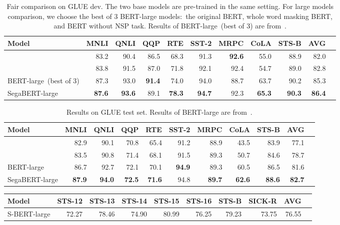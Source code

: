 \documentclass[letterpaper]{article}
\begin{document}
\begin{table*}[!htp]\centering
  \small
  \begin{tabular}{lrrrrrrrrrr}\toprule
    Model &MNLI &QNLI &QQP &RTE &SST-2 &MRPC &CoLA &STS-B &AVG \\\midrule
     &83.2 &90.4 &86.5 &68.3 &91.3 &\textbf{92.6} &55.0 &88.9 &82.0 \\
     &83.8 &91.5 &87.0 &71.8 &92.1 &92.4 &54.7 &89.0 &82.8 \\
    BERT-large~(best of 3) &87.3 &93.0 &\textbf{91.4} &74.0 &94.0 &88.7 &63.7 &90.2 &85.3 \\
    SegaBERT-large &\textbf{87.6} &\textbf{93.6} &89.1 &\textbf{78.3} &\textbf{94.7} &92.3 &\textbf{65.3} &\textbf{90.3} &\textbf{86.4} \\
  \bottomrule
  \end{tabular}
  \caption{Fair comparison on GLUE dev. The two base models are pre-trained in the same setting. For large models comparison, we choose the best of 3 BERT-large models:\ the original BERT, whole word masking BERT, and BERT without NSP task. Results of BERT-large~(best of 3) are from~\citet{DBLP:conf/nips/XLNet}.}\label{tab: glue_fair}
  \end{table*} \begin{table*}[ht]\centering
  \small
  \begin{tabular}{lrrrrrrrrrr}\toprule
    Model &MNLI &QNLI &QQP &RTE &SST-2 &MRPC &CoLA &STS-B &AVG \\\midrule
     &82.9 &90.1 &70.8 &65.4 &91.2 &88.9 &43.5 &83.9 &77.1 \\
     &83.5 &90.8 &71.4 &68.1 &91.5 &89.3 &50.7 &84.6 &78.7 \\
    BERT-large &86.7 &92.7 &72.1 &70.1 &\textbf{94.9} &89.3 &60.5 &86.5 &81.6 \\
    SegaBERT-large &\textbf{87.9} &\textbf{94.0} &\textbf{72.5} &\textbf{71.6} &94.8 &\textbf{89.7} &\textbf{62.6} &\textbf{88.6} &\textbf{82.7} \\
  \bottomrule
  \end{tabular}
  \caption{Results on GLUE test set. Results of BERT-large are from~\citet{DBLP:journals/corr/bert}.}\label{tab: glue_test}
  \end{table*} \begin{table*}[ht!]\centering
  \small
  \begin{tabular}{lrrrrrrrrr}\toprule
   Model&STS-12 &STS-13 &STS-14 &STS-15 &STS-16 &STS-B &SICK-R &AVG \\\midrule
  S-BERT-large &72.27 &78.46 &74.90 &80.99 &76.25 &79.23 &73.75 &76.55 \\

\end{tabular}
\end{table*}
\end{document}
